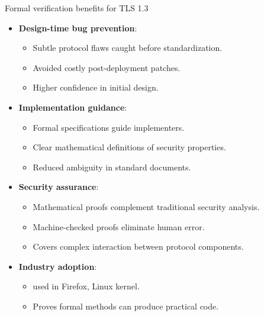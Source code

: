 \documentclass[aspectratio=169, lualatex, handout]{beamer}
\begin{document}
\begin{frame}{Formal verification benefits for TLS 1.3}
	\begin{itemize}[<+->]
		\item \textbf{Design-time bug prevention}:
		      \begin{itemize}
			      \item Subtle protocol flaws caught before standardization.
			      \item Avoided costly post-deployment patches.
			      \item Higher confidence in initial design.
		      \end{itemize}
		\item \textbf{Implementation guidance}:
		      \begin{itemize}
			      \item Formal specifications guide implementers.
			      \item Clear mathematical definitions of security properties.
			      \item Reduced ambiguity in standard documents.
		      \end{itemize}
		\item \textbf{Security assurance}:
		      \begin{itemize}
			      \item Mathematical proofs complement traditional security analysis.
			      \item Machine-checked proofs eliminate human error.
			      \item Covers complex interaction between protocol components.
		      \end{itemize}
		\item \textbf{Industry adoption}:
		      \begin{itemize}
			      \item \haclstar used in Firefox, Linux kernel.
			      \item Proves formal methods can produce practical code.
		      \end{itemize}
	\end{itemize}
\end{frame}
\end{document}
